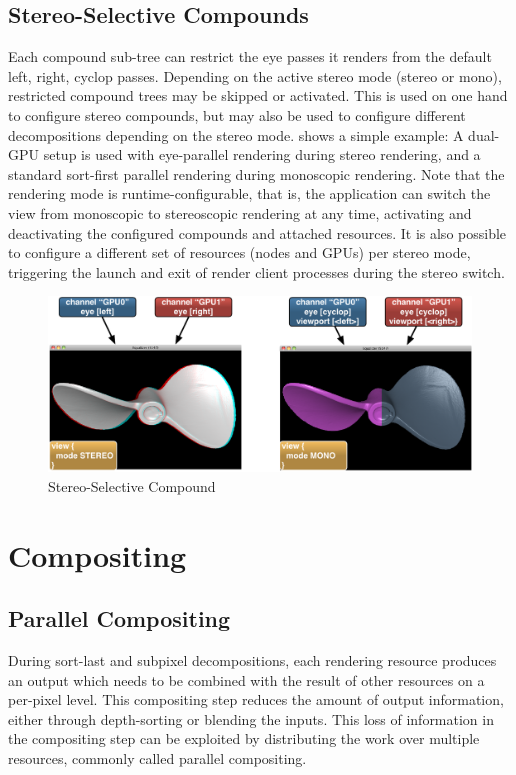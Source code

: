 \section{Stereo-Selective Compounds}

Each compound sub-tree can restrict the eye passes it renders from the default
left, right, cyclop passes. Depending on the active stereo mode (stereo or
mono), restricted compound trees may be skipped or activated. This is used on
one hand to configure stereo compounds, but may also be used to configure
different decompositions depending on the stereo mode.  shows
a simple example: A dual-GPU setup is used with eye-parallel rendering during
stereo rendering, and a standard sort-first parallel rendering during monoscopic
rendering. Note that the rendering mode is runtime-configurable, that is, the
application can switch the view from monoscopic to stereoscopic rendering at any
time, activating and deactivating the configured compounds and attached
resources. It is also possible to configure a different set of resources (nodes
and GPUs) per stereo mode, triggering the launch and exit of render client
processes during the stereo switch.

\begin{figure}[h!t]\center
 \includegraphics[width=\columnwidth]{images/stereoSwitch}
 {\caption{\label{fStereoSwitch}Stereo-Selective Compound}}
\end{figure}

\chapter{Compositing}\label{sCompositing}

\section{Parallel Compositing}

During sort-last and subpixel decompositions, each rendering resource produces
an output which needs to be combined with the result of other resources on a
per-pixel level. This compositing step reduces the amount of output information,
either through depth-sorting or blending the inputs. This loss of information in
the compositing step can be exploited by distributing the work over multiple
resources, commonly called parallel compositing.

